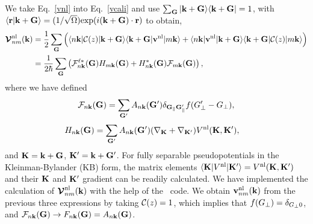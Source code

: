 \documentclass[floatfix,prb,aps,superscriptaddress,showpacs,11pt,preprint,letterpaper]{revtex4}
\begin{document}
We take Eq.~\eqref{vnl} into Eq.~\eqref{vcali}
and use
$\sum_{\mathbf{G}}| \mathbf{k}+\mathbf{G} \rangle\langle \mathbf{k}+\mathbf{G} |=1$, 
with
$\langle {\mathbf{r}} | {\mathbf{k}+\mathbf{G}} \rangle=(1/\sqrt{\Omega})
\mathrm{exp}(i(\mathbf{k}+\mathbf{G})\cdot\mathbf{r})$
to obtain,
\begin{align}\label{vnl.5}
\boldsymbol{\mathcal{\cal V}}^{\mathrm{nl}}_{nm}(\mathbf{k})&=\frac{1}{2}
\sum_{\mathbf{G}}
\Big(
\langle n\mathbf{k} | {\mathbf{\cal C}}(z) 
| \mathbf{k}+\mathbf{G} \rangle\langle \mathbf{k}+\mathbf{G} |
\mathbf{v}^{\mathrm{nl}} | m\mathbf{k} \rangle
+
\langle n\mathbf{k} |
\mathbf{v}^{\mathrm{nl}}  
| \mathbf{k}+\mathbf{G} \rangle\langle \mathbf{k}+\mathbf{G} |
{\mathbf{\cal C}}(z) | m\mathbf{k} \rangle
\Big)
\nonumber\\
&=\frac{1}{2 \hbar}
\sum_{\mathbf{G}}
\left(
{\mathbf{\cal F}}^{\ell*}_{n\mathbf{k}}(\mathbf{G}) 
H_{m\mathbf{k}}(\mathbf{G}) 
+
H^*_{n\mathbf{k}}(\mathbf{G}) 
{\mathbf{\cal F}}_{m\mathbf{k}}(\mathbf{G}) 
\right) 
,
\end{align}  
where 
we have defined  
\begin{align}\label{vnl.10}
{\mathbf{\cal F}}_{n\mathbf{k}}(\mathbf{G}) 
=
\sum_{\mathbf{G}'} 
A_{n\mathbf{k}}(\mathbf{G}') 
\delta_{\mathbf{G}_\parallel \mathbf{G}'_\parallel}f(G'_\perp-G_\perp) 
,
\end{align} 
\begin{align}\label{vnl.11}
H_{n\mathbf{k}}(\mathbf{G})&=
\sum_{\mathbf{G}'} 
A_{n\mathbf{k}}(\mathbf{G}') 
(\nabla_{\mathbf{K}}+\nabla_{\mathbf{K}'})  
V^{\mathrm{nl}}(\mathbf{K},\mathbf{K}')
,
\end{align}
and $\mathbf{K}=\mathbf{k}+\mathbf{G}$, $\mathbf{K}'=\mathbf{k}+\mathbf{G}'$.
For fully  separable pseudopotentials in the   
Kleinman-Bylander (KB) form,\cite{mottaCMS10,kleinmanPRL82,adolphPRB96}  
the  
matrix elements 
 $\langle \mathbf{K} |  
V^{\mathrm{nl}}  
| \mathbf{K}' \rangle
=V^{\mathrm{nl}}(\mathbf{K},\mathbf{K}')  
$ 
and their $\mathbf{K}$ and $\mathbf{K}'$ gradient 
can be readily calculated.\cite{mottaCMS10,adolphPRB96,gordienkoRPJ04,fuchsCPC99} 
We have 
implemented 
the calculation of $\boldsymbol{\mathcal{\cal V}}^{\mathrm{nl}}_{nm}(\mathbf{k})$ with the help of 
the \depe~code.\cite{francesco}
We obtain $\mathbf{v}^{\mathrm{nl}}_{nm}(\mathbf{k})$ from the previous three 
expressions by taking ${\mathbf{\cal C}}(z)=1$, which implies 
that $f(G_\perp)=\delta_{G_\perp 0}$, 
and 
${\mathbf{\cal F}}_{n\mathbf{k}}(\mathbf{G}) \to F_{n\mathbf{k}}(\mathbf{G})=A_{n\mathbf{k}}(\mathbf{G})$.
\end{document}
